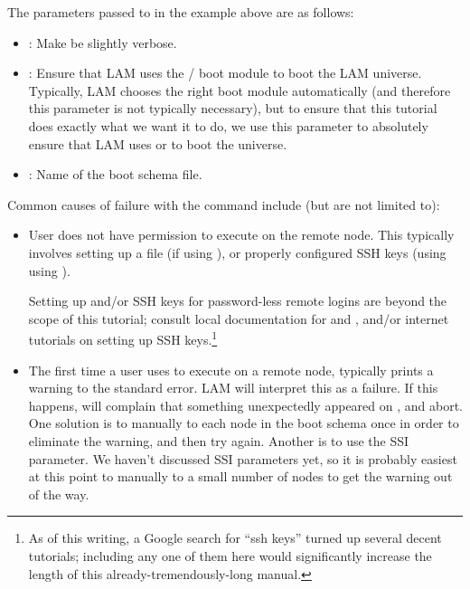 The parameters passed to  in the example above are as
follows:

\begin{itemize}
\item {}: Make  be slightly verbose.
  
\item {}: Ensure that LAM uses the
  / boot module to boot the LAM universe.
  Typically, LAM chooses the right boot module automatically (and
  therefore this parameter is not typically necessary), but to ensure
  that this tutorial does exactly what we want it to do, we use this
  parameter to absolutely ensure that LAM uses  or 
  to boot the universe.

\item {}: Name of the boot schema file.
\end{itemize}

Common causes of failure with the  command include (but
are not limited to):

\begin{itemize}
\item User does not have permission to execute on the remote node.
  This typically involves setting up a  file (if
  using ), or properly configured SSH keys (using using
  ).
  
  Setting up  and/or SSH keys for password-less remote
  logins are beyond the scope of this tutorial; consult local
  documentation for  and , and/or internet tutorials
  on setting up SSH keys.\footnote{As of this writing, a Google search
    for ``ssh keys'' turned up several decent tutorials; including any
    one of them here would significantly increase the length of this
    already-tremendously-long manual.}
  
\item The first time a user uses  to execute on a remote
  node,  typically prints a warning to the standard error.
  LAM will interpret this as a failure.  If this happens,
   will complain that something unexpectedly appeared on
  , and abort.  
%
%
  One solution is to manually  to each node in the boot
  schema once in order to eliminate the  warning, and
  then try  again.  Another is to use the
   SSI parameter.  We
  haven't discussed SSI parameters yet, so it is probably easiest at
  this point to manually  to a small number of nodes to get
  the warning out of the way.
%
\end{itemize}

